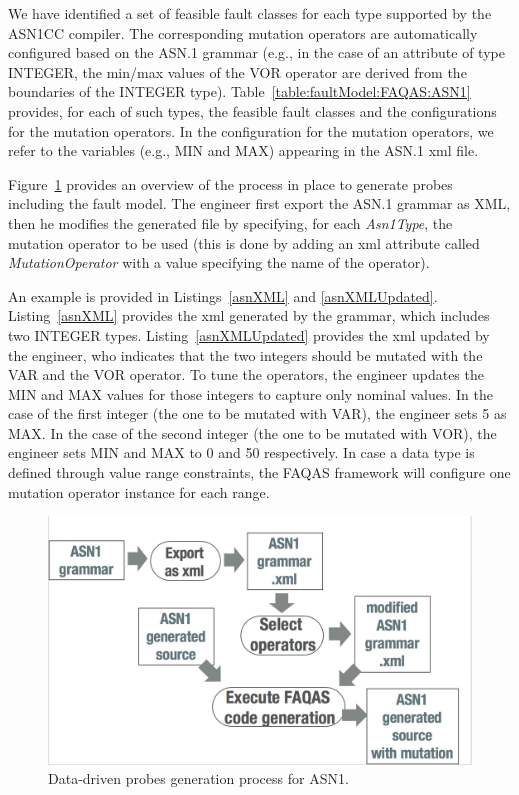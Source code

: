 We have identified a set of feasible fault classes for each type supported by the ASN1CC compiler.
The corresponding mutation operators are automatically configured based on the ASN.1 grammar (e.g., in the case of an attribute of type INTEGER, the min/max values of the VOR operator are derived from the boundaries of the INTEGER type).
Table~\ref{table:faultModel:FAQAS:ASN1} provides, for each of such types, the feasible fault classes and the configurations for the mutation operators.
In the configuration for the mutation operators, we refer to the variables (e.g., MIN and MAX) appearing in the ASN.1 xml file.

Figure~\ref{fig:ASN1ProbesGeneration} provides an overview of the process in place to generate probes including the fault model.
The engineer first export the ASN.1 grammar as XML, then he modifies the generated file by specifying, for each \emph{Asn1Type}, the mutation operator to be used (this is done by adding an xml attribute called \emph{MutationOperator} with a value specifying the name of the operator). 

An example is provided in Listings~\ref{asnXML} and \ref{asnXMLUpdated}. Listing~\ref{asnXML} provides the xml generated by the grammar, which includes two INTEGER types.
Listing~\ref{asnXMLUpdated} provides the xml updated by the engineer, who indicates that the two integers should be mutated with the VAR and the VOR operator. To tune the operators, the engineer updates the MIN and MAX values for those integers to capture only nominal values. 
In the case of the first integer (the one to be mutated with VAR), the engineer sets 5 as MAX.
In the case of the second integer (the one to be mutated with VOR), the engineer sets MIN and MAX to 0 and 50 respectively.
In case a data type is defined through value range constraints, the FAQAS framework will configure one mutation operator instance for each range.




\begin{figure}[h]
  \centering
    \includegraphics[width=12cm]{images/ASN1mutationProces}
      \caption{Data-driven probes generation process for ASN1.}
      \label{fig:ASN1ProbesGeneration}
\end{figure}


